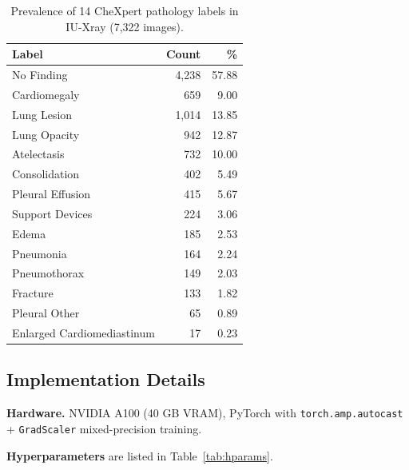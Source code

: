 \documentclass[11pt, a4paper]{article}
\begin{document}
\begin{table}[H]
  \centering
  \caption{Prevalence of 14 CheXpert pathology labels in IU-Xray (7,322 images).}
  \label{tab:labels}
  \renewcommand{\arraystretch}{1.05}
  \begin{tabular}{lrr}
    \toprule
    \textbf{Label} & \textbf{Count} & \textbf{\%} \\
    \midrule
    No Finding                  & 4,238 & 57.88 \\
    Cardiomegaly                &   659 &  9.00 \\
    Lung Lesion                 & 1,014 & 13.85 \\
    Lung Opacity                &   942 & 12.87 \\
    Atelectasis                 &   732 & 10.00 \\
    Consolidation               &   402 &  5.49 \\
    Pleural Effusion            &   415 &  5.67 \\
    Support Devices             &   224 &  3.06 \\
    Edema                       &   185 &  2.53 \\
    Pneumonia                   &   164 &  2.24 \\
    Pneumothorax                &   149 &  2.03 \\
    Fracture                    &   133 &  1.82 \\
    Pleural Other               &    65 &  0.89 \\
    Enlarged Cardiomediastinum  &    17 &  0.23 \\
    \bottomrule
  \end{tabular}
\end{table}

\subsection{Implementation Details}

\textbf{Hardware.} NVIDIA A100 (40 GB VRAM), PyTorch with
\texttt{torch.amp.autocast} + \texttt{GradScaler} mixed-precision training.

\textbf{Hyperparameters} are listed in Table~\ref{tab:hparams}.
\end{document}
